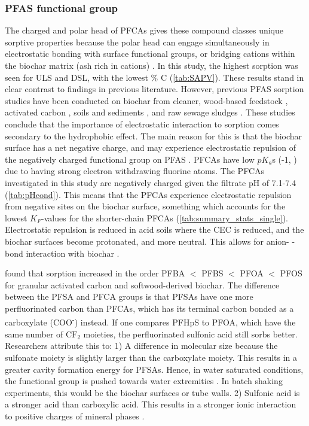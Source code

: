 \subsubsection{PFAS functional group} 
The charged and polar head of PFCAs gives these compound classes unique sorptive properties because the polar head can engage simultaneously in electrostatic bonding with surface functional groups, or bridging cations within the biochar matrix (ash rich in cations) \citep{zhang2013sorption,sigmund2022sorption}. In this study, the highest sorption was seen for ULS and DSL, with the lowest \% C (\cref{tab:SAPV}). These results stand in clear contrast to findings in previous literature. However, previous PFAS sorption studies have been conducted on biochar from cleaner, wood-based feedstock \citep{Sormo2021}, activated carbon \citep{zhang2021sorption,Kupryianchyk2016b}, soils and sediments \citep{higgins2006sorption}, and raw sewage sludges \citep{zhang2013sorption}. These studies conclude that the importance of electrostatic interaction to sorption comes secondary to the hydrophobic effect. The main reason for this is that the biochar surface has a net negative charge, and may experience electrostatic repulsion of the negatively charged functional group on PFAS \citep{Ahmad2014}. PFCAs have low $pK_a$s (-1, \citep{goss2008pKa}) due to having strong electron withdrawing fluorine atoms. The PFCAs investigated in this study are negatively charged given the filtrate pH of 7.1-7.4 (\cref{tab:pHcond}). This means that the PFCAs experience electrostatic repulsion from negative sites on the biochar surface, something which accounts for the lowest $K_F$-values for the shorter-chain PFCAs (\cref{tab:summary_stats_single}). Electrostatic repulsion is reduced in acid soils where the CEC is reduced, and the biochar surfaces become protonated, and more neutral. This allows for anion- \textpi-bond interaction with biochar \citep{sigmund2022sorption}. 

\cite{zhang2021sorption} found that sorption increased in the order PFBA $<$ PFBS $<$ PFOA $<$ PFOS for granular activated carbon and softwood-derived biochar. The difference between the PFSA and PFCA groups is that PFSAs have one more perfluorinated carbon than PFCAs, which has its terminal carbon bonded as a carboxylate (COO\textsuperscript{-}) instead. If one compares PFHpS to PFOA, which have the same number of $\mathrm{CF_2}$ moieties, the perfluorinated sulfonic acid still sorbs better. Researchers attribute this to: 1) A difference in molecular size because the sulfonate moiety is slightly larger than the carboxylate moiety. This results in a greater cavity formation energy for PFSAs. Hence, in water saturated conditions, the functional group is pushed towards water extremities \citep{yin2022insights,sigmund2022sorption}. In batch shaking experiments, this would be the biochar surfaces or tube walls. 2) Sulfonic acid is a stronger acid than carboxylic acid. This results in a stronger ionic interaction to positive charges of mineral phases \citep{arvaniti2015review}. 

